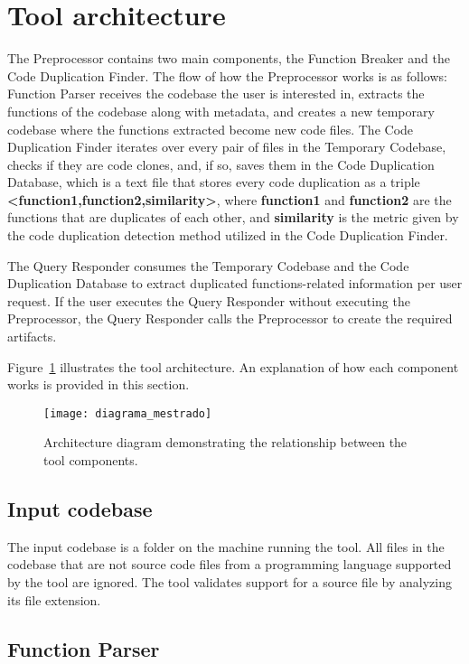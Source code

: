 \en

\section{Tool architecture}
\label{subsec:architecture}

The Preprocessor contains two main components, the Function Breaker and the Code Duplication Finder. 
The flow of how the Preprocessor works is as follows: Function Parser receives the codebase the user is interested in,
extracts the functions of the codebase along with metadata, and creates a new temporary codebase where the functions extracted become new code files. 
The Code Duplication Finder iterates over every pair of files in the Temporary Codebase, checks if they are code clones, and, 
if so, saves them in the Code Duplication Database, which is a text file that stores every code duplication as a triple 
\textbf{<function1,function2,similarity>}, where \textbf{function1} and \textbf{function2} are the functions that are duplicates 
of each other, and \textbf{similarity} is the metric given by the code duplication detection method utilized in the Code Duplication Finder.

The Query Responder consumes the Temporary Codebase and the Code Duplication Database to extract duplicated 
functions-related information per user request. If the user executes the Query Responder without executing the 
Preprocessor, the Query Responder calls the Preprocessor to create the required artifacts.

Figure~\ref{fig:diagram} illustrates the tool architecture. An explanation of how each component works is provided in this section.

\begin{figure}
\texttt{[image: diagrama\_mestrado]}
\caption{Architecture diagram demonstrating the relationship between the tool components.}
\label{fig:diagram}
\end{figure}

\subsection{Input codebase}

The input codebase is a folder on the machine running the tool. All files in the codebase that are not source code files from a programming language supported by the tool are ignored. The tool validates support for a source file by analyzing its file extension.

\subsection{Function Parser}


